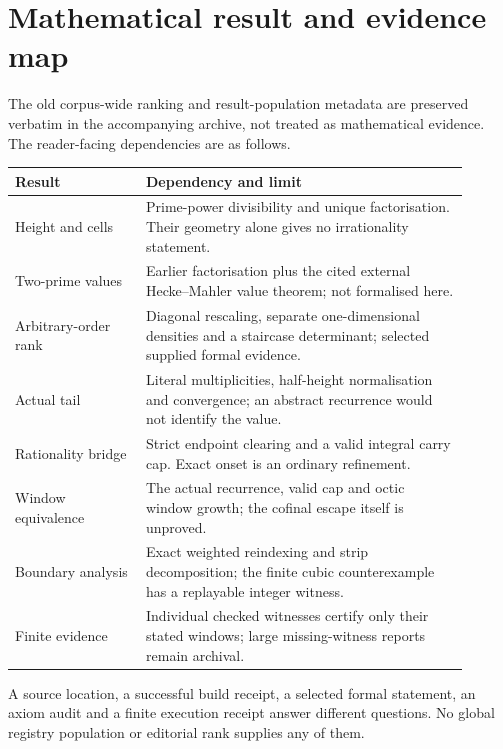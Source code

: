 \clearpage
\section{Mathematical result and evidence map}
\label{sec:erdos-269-complete-family-map}
The old corpus-wide ranking and result-population metadata are preserved
verbatim in the accompanying archive, not treated as mathematical evidence.
The reader-facing dependencies are as follows.

\begin{center}\small
\begin{tabular}{p{0.26\linewidth}p{0.64\linewidth}}
\hline
Result & Dependency and limit\\\hline
Height and cells & Prime-power divisibility and unique factorisation.
Their geometry alone gives no irrationality statement.\\
Two-prime values & Earlier factorisation plus the cited external
Hecke--Mahler value theorem; not formalised here.\\
Arbitrary-order rank & Diagonal rescaling, separate one-dimensional
densities and a staircase determinant; selected supplied formal evidence.\\
Actual tail & Literal multiplicities, half-height normalisation and
convergence; an abstract recurrence would not identify the value.\\
Rationality bridge & Strict endpoint clearing and a valid integral carry
cap.  Exact onset is an ordinary refinement.\\
Window equivalence & The actual recurrence, valid cap and octic window
growth; the cofinal escape itself is unproved.\\
Boundary analysis & Exact weighted reindexing and strip decomposition;
the finite cubic counterexample has a replayable integer witness.\\
Finite evidence & Individual checked witnesses certify only their stated
windows; large missing-witness reports remain archival.\\\hline
\end{tabular}
\end{center}
A source location, a successful build receipt, a selected formal statement,
an axiom audit and a finite execution receipt answer different questions.
No global registry population or editorial rank supplies any of them.
